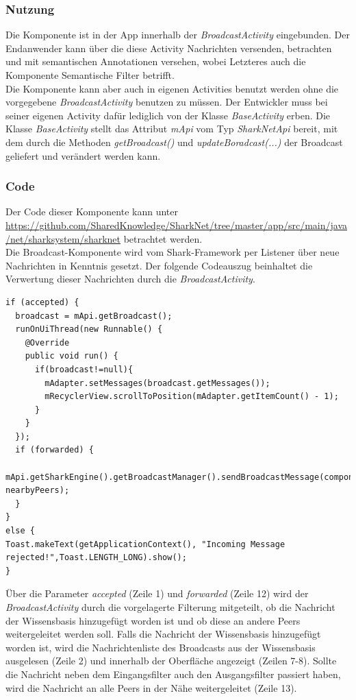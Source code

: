 \subsubsection{Nutzung}
Die Komponente ist in der App innerhalb der \textit{BroadcastActivity} eingebunden. Der Endanwender kann über die diese Activity Nachrichten versenden, betrachten und mit semantischen Annotationen versehen, wobei Letzteres auch die Komponente Semantische Filter betrifft.
\\Die Komponente kann aber auch in eigenen Activities benutzt werden ohne die vorgegebene \textit{BroadcastActivity} benutzen zu müssen. Der Entwickler muss bei seiner eigenen Activity dafür lediglich von der Klasse \textit{BaseActivity} erben. Die Klasse \textit{BaseActivity} stellt das Attribut \textit{mApi} vom Typ \textit{SharkNetApi} bereit, mit dem durch die Methoden \textit{getBroadcast()} und \textit{updateBoradcast(...)} der Broadcast geliefert und verändert werden kann.
\\

\subsubsection{Code}
Der Code dieser Komponente kann unter \url{https://github.com/SharedKnowledge/SharkNet/tree/master/app/src/main/java/net/sharksystem/sharknet} betrachtet werden. 
\\Die Broadcast-Komponente wird vom Shark-Framework per Listener über neue Nachrichten in Kenntnis gesetzt. Der folgende Codeauszug beinhaltet die Verwertung dieser Nachrichten durch die \textit{BroadcastActivity}. \newline
 \lstset{language=Java, caption=Anzeige und Weiterleitungen von Nachrichten (Auszug), label=DescriptiveLabel, numbers=left, numbersep=1em, breaklines=true, basicstyle=\small}
\begin{lstlisting}
if (accepted) {
  broadcast = mApi.getBroadcast();
  runOnUiThread(new Runnable() {
    @Override
    public void run() {
      if(broadcast!=null){
        mAdapter.setMessages(broadcast.getMessages());
        mRecyclerView.scrollToPosition(mAdapter.getItemCount() - 1);
      }
    }
  });
  if (forwarded) {
    mApi.getSharkEngine().getBroadcastManager().sendBroadcastMessage(component, nearbyPeers);
  }
}
else {
Toast.makeText(getApplicationContext(), "Incoming Message rejected!",Toast.LENGTH_LONG).show();
}
\end{lstlisting}
Über die Parameter \textit{accepted} (Zeile 1) und \textit{forwarded} (Zeile 12) wird der \textit{BroadcastActivity} durch die vorgelagerte Filterung mitgeteilt, ob die Nachricht der Wissensbasis hinzugefügt worden ist und ob diese an andere Peers weitergeleitet werden soll. Falls die Nachricht der Wissensbasis hinzugefügt worden ist, wird die Nachrichtenliste des Broadcasts aus der Wissensbasis ausgelesen (Zeile 2) und innerhalb der Oberfläche angezeigt (Zeilen 7-8). Sollte die Nachricht neben dem Eingangsfilter auch den Ausgangsfilter passiert haben, wird die Nachricht an alle Peers in der Nähe weitergeleitet (Zeile 13). 

